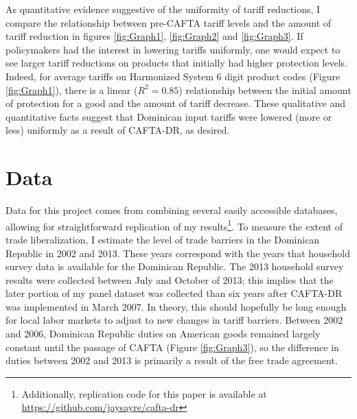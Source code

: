\documentclass[12pt]{article}
\begin{document}
As quantitative evidence suggestive of the uniformity of tariff reductions, 
I compare the relationship between pre-CAFTA tariff
levels and the amount of tariff reduction in figures \ref{fig:Graph1}, \ref{fig:Graph2} and 
\ref{fig:Graph3}. If policymakers had the interest
in lowering tariffs uniformly, one would expect to see larger tariff reductions on products that
initially had higher protection levels. Indeed, for average tariffs on Harmonized System 
6 digit product codes (Figure \ref{fig:Graph1}), there is a linear ($R^2=0.85$) relationship 
between the initial amount of protection for a good and
the amount of tariff decrease. These qualitative and quantitative facts
suggest that Dominican input tariffs
were lowered (more or less) uniformly as a result of CAFTA-DR, as desired.

\vspace{-10pt}
\section{Data}
\label{sec:Data}
Data for this project comes from combining several easily accessible databases, allowing
for straightforward replication of my results\footnote{Additionally, replication code for this 
paper is available at \url{https://github.com/jaysayre/cafta-dr}}.
To measure the extent of trade liberalization, I estimate the level of trade barriers in the
Dominican Republic in 2002 and 2013. These years correspond with the years that household
survey data is available for the Dominican Republic. The 2013 household survey results were collected 
between July and October of 2013; this implies
that the later portion of my panel dataset was collected than six years after CAFTA-DR was implemented 
in March 2007. In theory, this should hopefully be long enough for local labor markets to adjust 
to new changes in tariff barriers.
Between 2002 and 2006, Dominican Republic duties on American goods 
remained largely constant until the passage of CAFTA (Figure \ref{fig:Graph3}), so the 
difference in duties between 2002 and 2013 is primarily a result of the free trade agreement.
\end{document}
